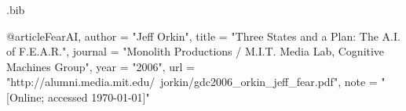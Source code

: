 \begin{filecontents*}{\jobname.bib}

@article{FearAI,
	author	= "Jeff Orkin",
	title		= "Three States and a Plan: The A.I. of F.E.A.R.",
	journal	= "Monolith Productions / M.I.T. Media Lab, Cognitive Machines Group",
	year		= "2006",
	url 		= "http://alumni.media.mit.edu/~jorkin/gdc2006\_orkin\_jeff\_fear.pdf",
	note		= "[Online; accessed \today]"
}



\end{filecontents*}

